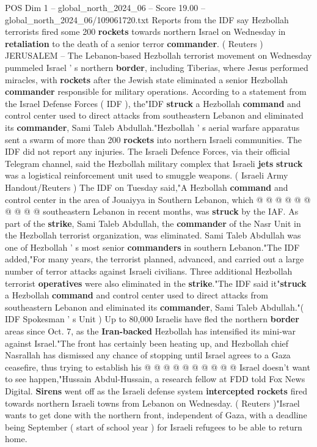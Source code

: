 \begin{textsample}{POS Dim 1 – global\_north\_2024\_06 – Score 19.00 – global\_north\_2024\_06/109061720.txt}  \label{ex:f1_pos_316}
Reports from the IDF say Hezbollah terrorists fired some 200 \textbf{rockets} towards northern Israel on Wednesday in \textbf{retaliation} to the death of a senior terror \textbf{commander}. ( Reuters ) JERUSALEM -- The Lebanon-based Hezbollah terrorist movement on Wednesday pummeled Israel ' s northern \textbf{border}, including Tiberias, where Jesus performed miracles, with \textbf{rockets} after the Jewish state eliminated a senior Hezbollah \textbf{commander} responsible for military operations.
According to a statement from the Israel Defense Forces ( IDF ), the"IDF \textbf{struck} a Hezbollah \textbf{command} and control center used to direct attacks from southeastern Lebanon and eliminated its \textbf{commander}, Sami Taleb Abdullah."Hezbollah ' s aerial warfare apparatus sent a swarm of more than 200 \textbf{rockets} into northern Israeli communities.
The IDF did not report any injuries.
The Israeli Defence Forces, via their official Telegram channel, said the Hezbollah military complex that Israeli \textbf{jets} \textbf{struck} was a logistical reinforcement unit used to smuggle weapons. ( Israeli Army Handout/Reuters ) The IDF on Tuesday said,"A Hezbollah \textbf{command} and control center in the area of Jouaiyya in Southern Lebanon, which @ @ @ @ @ @ @ @ @ @ southeastern Lebanon in recent months, was \textbf{struck} by the IAF.
As part of the \textbf{strike}, Sami Taleb Abdullah, the \textbf{commander} of the Nasr Unit in the Hezbollah terrorist organization, was eliminated.
Sami Taleb Abdullah was one of Hezbollah ' s most senior \textbf{commanders} in southern Lebanon."The IDF added,"For many years, the terrorist planned, advanced, and carried out a large number of terror attacks against Israeli civilians.
Three additional Hezbollah terrorist \textbf{operatives} were also eliminated in the \textbf{strike}."The IDF said it"\textbf{struck} a Hezbollah \textbf{command} and control center used to direct attacks from southeastern Lebanon and eliminated its \textbf{commander}, Sami Taleb Abdullah."( IDF Spokesman ' s Unit ) Up to 80,000 Israelis have fled the northern \textbf{border} areas since Oct. 7, as the \textbf{Iran-backed} Hezbollah has intensified its mini-war against Israel."The front has certainly been heating up, and Hezbollah chief Nasrallah has dismissed any chance of stopping until Israel agrees to a Gaza ceasefire, thus trying to establish his @ @ @ @ @ @ @ @ @ @ Israel doesn't want to see happen,"Hussain Abdul-Hussain, a research fellow at FDD told Fox News Digital. \textbf{Sirens} went off as the Israeli defense system \textbf{intercepted} \textbf{rockets} fired towards northern Israeli towns from Lebanon on Wednesday. ( Reuters )"Israel wants to get done with the northern front, independent of Gaza, with a deadline being September ( start of school year ) for Israeli refugees to be able to return home.

\end{textsample}
